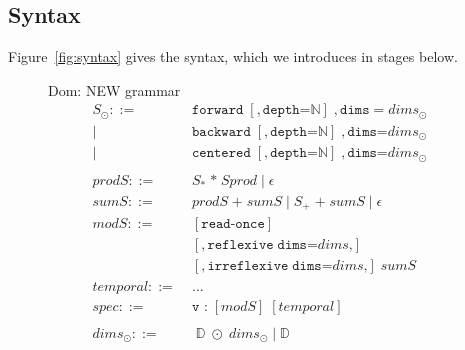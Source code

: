 \documentclass[9pt]{sigplanconf}
\newcommand{\dnote}[1]{\textcolor{darkpurple}{Dom: #1}}
\theoremstyle{definition}
\begin{document}
\subsection{Syntax}
\label{sec:syntax}

Figure~\ref{fig:syntax}
gives the syntax, which we introduces in stages below. 



\begin{figure}
\dnote{NEW grammar}
\begin{align*}
S_\odot ::= \; & \texttt{forward} \; [,\texttt{depth=}\mathbb{N}] \; 
        , \texttt{dims}=\textit{dims}_\odot  \\
\mid \; & \texttt{backward} \; [,\texttt{depth=}\mathbb{N}] \; , \texttt{dims=}\textit{dims}_\odot \\
\mid \; & \texttt{centered} \; [,\texttt{depth=}\mathbb{N}] \; , \texttt{dims=}\textit{dims}_\odot \\ \\
\textit{prodS} ::= \; & S_{\texttt{*}}  \; \texttt{*} \; Sprod \mid \epsilon \\
\textit{sumS} ::= \; & \textit{prodS} \; \texttt{+} \; \textit{sumS} \mid S_{\texttt{+}} \; \texttt{+}
          \; \textit{sumS} \mid \epsilon \\ 
\textit{modS} ::= \; & 
  [\texttt{read-once}] \\
  & [, \texttt{reflexive} \; \texttt{dims=}\textit{dims}{\texttt{,}}] \\
  & [, \texttt{irreflexive} \;
    \texttt{dims=}\textit{dims}{\texttt{,}}] \; \textit{sumS} \\ 
\textit{temporal} ::= \; & \ldots \\ 
\textit{spec} ::= \; & \texttt{v :} \; [\textit{modS}] \; [\textit{temporal}]   \\ \\
\textit{dims}_\odot ::= & \; \mathbb{D} \; \odot \; \textit{dims}_{\odot} \mid \mathbb{D}
%
%
\end{align*}


\end{figure}
\end{document}
